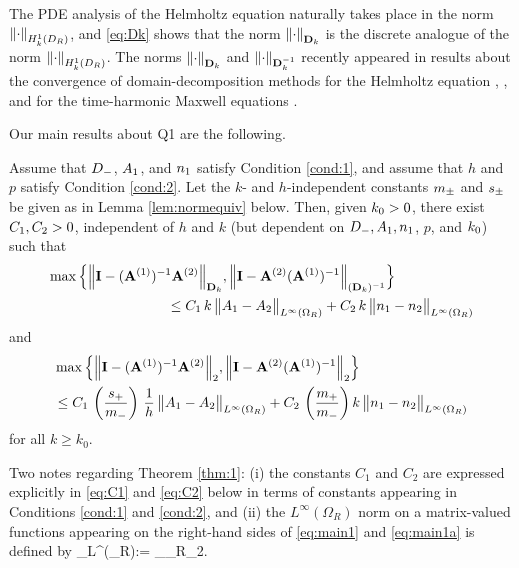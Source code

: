 The PDE analysis of the Helmholtz equation naturally takes place in the norm $\NHokDR{\cdot}$, and \eqref{eq:Dk} shows that the norm $\NDmatk{\cdot}$ is
the discrete analogue of the norm $\NHokDR{\cdot}$. %
The norms $\NDmatk{\cdot}$ and $\NDmatkI{\cdot}$ recently appeared in results about the convergence of domain-decomposition methods %
for the Helmholtz equation \cite{GrSpVa:17}, \cite{GrSpZo:18}, and for the time-harmonic Maxwell equations \cite{BoDoGrSpTo:17}. 

Our main results about Q1 are the following.

\begin{theorem}\label{thm:1}
Assume that $D_{-}$, $A_{1}$, and $n_{1}$ satisfy Condition \ref{cond:1}, and assume that $h$ and $p$ satisfy Condition \ref{cond:2}. 
Let the $k$- and $h$-independent constants $m_{\pm}$ and $s_{\pm}$ be given as in Lemma \ref{lem:normequiv} below.
Then, given $k_{0}>0$, there exist $C_{1}, C_{2}>0$, independent of $h$ and $k$ (but dependent on $D_{-}, A_{1}, n_{1}$, $p$, and $k_{0}$) such that
\begin{align}\nonumber
&\max\Big\{
\NDmatk{\Imat - (\Amat^{(1)})^{-1}\Amat^{(2)}}, 
\N{\Imat -\Amat^{(2)} (\Amat^{(1)})^{-1}}_{(\Dmat_k)^{-1}}
\Big\}\\
&\hspace{3cm} 
\leq C_1 \,k \,
\big\|\Ao-\At\big\|_{L^\infty(\Omega_R)} + C_2 \, k \, \big\|\no-\nt\big\|_{L^\infty(\Omega_R)}
\label{eq:main1}
\end{align}
and 
\begin{align}\nonumber
&\max\Big\{
\N{\Imat - (\Amat^{(1)})^{-1}\Amat^{(2)}}_2, 
\N{\Imat -\Amat^{(2)} (\Amat^{(1)})^{-1}}_2
\Big\}\\
&\hspace{0cm} 
\leq C_1 \,\left(\frac{s_+}{m_-}\right) \,\frac{1}{h} \,
\big\|\Ao-\At\big\|_{L^\infty(\Omega_R)} + C_2 \, \left(\frac{m_+}{m_-} \right)k \, \big\|\no-\nt\big\|_{L^\infty(\Omega_R)}
\label{eq:main1a}
\end{align}
for all $k\geq k_0$. 
\end{theorem}

Two notes regarding Theorem \ref{thm:1}: (i) the constants $C_1$ and $C_2$ are expressed explicitly in \eqref{eq:C1} and \eqref{eq:C2} below in terms of constants appearing in Conditions \ref{cond:1} and \ref{cond:2}, and (ii) the $L^\infty(\Omega_R)$ norm on a matrix-valued functions appearing on the right-hand sides of \eqref{eq:main1} and \eqref{eq:main1a} is defined by
\beqs
{}_{L^\infty(\Omega_R)}:= \esssup_{\bx\in\Omega_R}_2.
\eeqs

